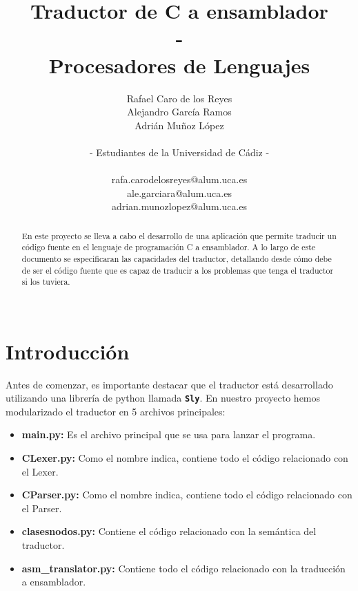 \documentclass[]{article}
\title{\textbf{Traductor de C a ensamblador \\ - \\ Procesadores de Lenguajes}}
\author{Rafael Caro de los Reyes \\ Alejandro García Ramos \\ Adrián Muñoz López \\\\ - Estudiantes de la Universidad de Cádiz - \\\\ rafa.carodelosreyes@alum.uca.es \\ ale.garciara@alum.uca.es \\ adrian.munozlopez@alum.uca.es}
\begin{document}
	
	\maketitle
	
	\begin{abstract}
	En este proyecto se lleva a cabo el desarrollo de una aplicación que permite traducir un código fuente en el lenguaje de programación C a ensamblador. A lo largo de este documento se especificaran las capacidades del traductor, detallando desde cómo debe de ser el código fuente que es capaz de traducir a los problemas que tenga el traductor si los tuviera.\\ \\
	\end{abstract}
	
	\section{Introducción}
        Antes de comenzar, es importante destacar que el traductor está desarrollado utilizando una librería de python llamada \texttt{\textbf{Sly}}. En nuestro proyecto hemos modularizado el traductor en 5 archivos principales: \\ \begin{itemize}
        \item \textbf{main.py:} Es el archivo principal que se usa para lanzar el programa.
        \item \textbf{CLexer.py:} Como el nombre indica, contiene todo el código relacionado con el Lexer.
        \item \textbf{CParser.py:} Como el nombre indica, contiene todo el código relacionado con el Parser.
        \item \textbf{clasesnodos.py:} Contiene el código relacionado con la semántica del traductor.
        \item \textbf{asm\_{translator.py:}} Contiene todo el código relacionado con la traducción a ensamblador. \\ \\
        \end{itemize}
\end{document}
